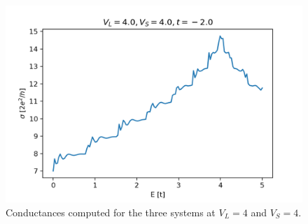 \documentclass[12pt]{article}
\numberwithin{equation}{section}
\begin{document}
\begin{figure}
\begin{minipage}{0.333\textwidth}
    \centering
    \includegraphics[width=1.0\textwidth]{./media/cond_2deg_W8_L10_VL4_0_VS4_0.png} %
  \end{minipage}
  \caption{Conductances computed for the three systems at $V_L=4$ and $V_S=4$.}
\end{figure}
\end{document}
